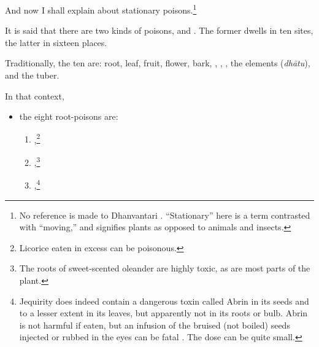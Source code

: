 \begin{translation}
    
    \item[1]
    And now I shall explain  about stationary 
    poisons.\footnote{No reference is made to Dhanvantari 
    \citep[see][]{birc-2021}. “Stationary” here is a term contrasted with “moving,” 
    and signifies plants as opposed to animals and insects.}
  
    \item[3]
    \noindent It is said that there are two kinds of poisons,
     and . The former
    dwells in ten sites, the latter in sixteen places.
   
    \item[4]
    Traditionally, the ten are: root, leaf, fruit, flower, bark,
    , , , the
    elements (\emph{dhātu}), and the tuber.

    \item[5]
    
    In that context,\label{poisonousplants}
    \begin{itemize}
        \item
        the eight root-poisons are:
        \begin{enumerate}
        \item {},\footnote{Licorice eaten in excess can be poisonous.}
       
        \item {},\footnote{The roots of sweet-scented oleander 
        are highly toxic, as are most parts of the plant.}
    
        \item {},\footnote{Jequirity does indeed contain a dangerous
toxin called Abrin in its seeds and to a lesser extent in its leaves,
but apparently not in its roots or bulb. Abrin is not harmful if eaten,
but an infusion of the bruised (not boiled) seeds injected or rubbed in
the eyes can be fatal \citep[\# 6]{NK}.  The dose can be quite small.}
        

\end{enumerate}
\end{itemize}
\end{translation}
